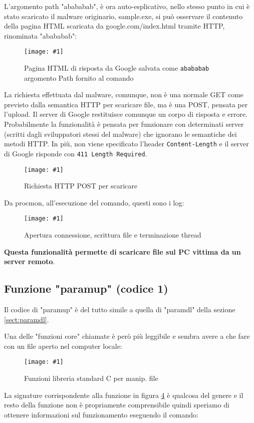\documentclass[
    a4paper, %
    11pt %
]{article}
\newcommand{\pic}[4]{\begin{figure}[H]
            \centering
            \texttt{[image: \#1]}
            \caption{#2}
            \label{fig:#1}
            \end{figure}}
\begin{document}
            L'argomento path "abababab", è ora auto-esplicativo, nello stesso punto
            in cui è stato scaricato il malware originario, sample.exe, si può osservare il contenuto della
            pagina HTML scaricata da google.com/index.html tramite HTTP, rinominata "abababab":

            \pic{adv_0_success_content}{Pagina HTML di risposta da Google salvata come \texttt{abababab} argomento Path fornito al comando}{18cm}{10cm}

            La richiesta effettuata dal malware, comunque, non è una normale GET come previsto dalla semantica
            HTTP per scaricare file, ma è una POST, pensata per l'upload. Il server di Google restituisce
            comunque un corpo di risposta e errore. Probabilmente la funzionalità è pensata per 
            funzionare con determinati server (scritti dagli sviluppatori stessi del malware) che ignorano
            le semantiche dei metodi HTTP. In più, non viene specificato l'header \texttt{Content-Length}
            e il server di Google risponde con \texttt{411 Length Required}.

            \pic{adv_0_illformed_request}{Richiesta HTTP POST per scaricare}{18cm}{9cm}

            Da procmon, all'esecuzione del comando, questi sono i log:

            \pic{adv_0_procmon}{Apertura connessione, scrittura file e terminazione thread}{15cm}{5cm}

            \textbf{Questa funzionalità permette di scaricare file sul PC vittima da un server remoto}.

            \subsection{Funzione "paramup" (codice 1)}

            Il codice di "paramup" è del tutto simile a quella di "paramdl" della sezione \ref{sect:paramdl}.

            Una delle "funzioni core" chiamate è però più leggibile e sembra avere a che fare con un file
            aperto nel computer locale:

            \pic{adv_1_fileread}{Funzioni libreria standard C per manip. file}{15cm}{8cm}

            La signature corrispondente alla funzione in figura \ref{fig:adv_1_fileread} è qualcosa del genere e il resto della funzione non è propriamente comprensibile
            quindi speriamo di ottenere informazioni sul funzionamento eseguendo il comando:
\end{document}
